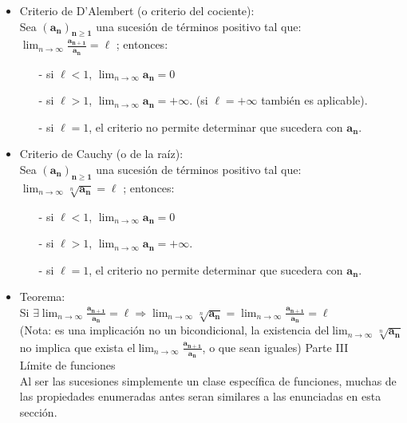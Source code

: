 \documentclass[a4paper,11pt]{report}
\begin{document}
\begin{itemize}
\item Criterio de D'Alembert (o criterio del cociente): \\
Sea $\mathbf{(a_n)_{n \geqslant 1}}$ una sucesión de términos positivo tal que: \\[5pt]
$\displaystyle \lim_{n\to\infty} \mathbf{\frac{a_{n+1}}{a_n}} = \ell$ ; entonces:
\begin{itemize}
\item[-] si $\ell < 1$, $\displaystyle \lim_{n\to\infty} \mathbf{a_n} = 0$ \\
\item[-] si $\ell > 1$, $\displaystyle \lim_{n\to\infty} \mathbf{a_n} = +\infty$. (si $\ell = +\infty$ también es aplicable).\\
\item[-] si $\ell = 1$, el criterio no permite determinar que sucedera con $\mathbf{a_n}$.
\end{itemize}
\item Criterio de Cauchy (o de la raíz): \\
Sea $\mathbf{(a_n)_{n \geqslant 1}}$ una sucesión de términos positivo tal que: \\[5pt]
$\displaystyle \lim_{n\to\infty} \sqrt[n]{\mathbf{a_n}} = \ell$  ; entonces:
\begin{itemize}
\item[-] si $\ell < 1$, $\displaystyle \lim_{n\to\infty} \mathbf{a_n} = 0$ \\
\item[-] si $\ell > 1$, $\displaystyle \lim_{n\to\infty} \mathbf{a_n} = +\infty$. \\
\item[-] si $\ell = 1$, el criterio no permite determinar que sucedera con $\mathbf{a_n}$.
\end{itemize}
\item Teorema: \\[5pt]
Si $\exists \displaystyle \lim_{n\to\infty} \mathbf{\frac{a_{n+1}}{a_n}} = \ell \Longrightarrow \displaystyle \lim_{n\to\infty} \sqrt[n]{\mathbf{a_n}} =  \lim_{n\to\infty} \mathbf{\frac{a_{n+1}}{a_n}} = \ell$ \\[5pt]
(Nota: es una implicación no un bicondicional, la existencia del$\displaystyle \lim_{n\to\infty} \sqrt[n]{\mathbf{a_n}}$ no implica que exista el$\displaystyle \lim_{n\to\infty} \mathbf{\frac{a_{n+1}}{a_n}}$, o que sean iguales)
\newpage 
{\large Parte III} \\[5pt]
{\huge Límite de funciones} \\
Al ser las sucesiones simplemente un clase específica de funciones, muchas de las propiedades enumeradas antes seran similares a las enunciadas en esta sección. \\

\end{itemize}
\end{document}
